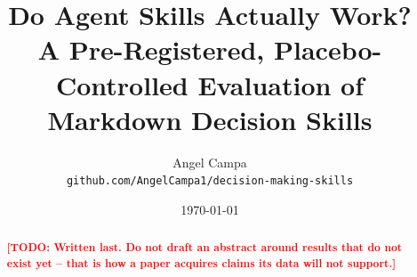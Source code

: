 \documentclass[11pt]{article}
\title{Do Agent Skills Actually Work?\\
\large A Pre-Registered, Placebo-Controlled Evaluation of\\Markdown Decision Skills}
\author{Angel Campa\\
\texttt{github.com/AngelCampa1/decision-making-skills}}
\date{\today}
\newcommand{\TODO}[1]{\textcolor{red}{\textbf{[TODO: #1]}}}
\newcommand{\TODO}[1]{}
\begin{document}
\maketitle

\begin{abstract}
\TODO{Written last. Do not draft an abstract around results that do not exist
yet -- that is how a paper acquires claims its data will not support.}
\end{abstract}













\appendix


\end{document}
